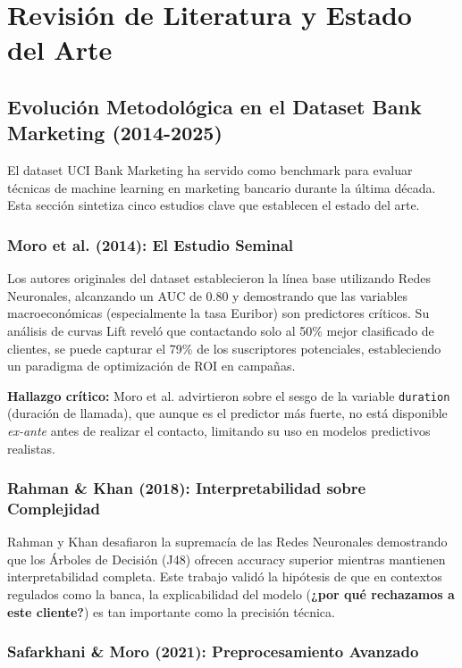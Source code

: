 \documentclass[12pt,letterpaper]{article}
\begin{document}
\newpage
\section{Revisión de Literatura y Estado del Arte}

\subsection{Evolución Metodológica en el Dataset Bank Marketing (2014-2025)}

El dataset UCI Bank Marketing ha servido como benchmark para evaluar técnicas de machine learning en marketing bancario durante la última década. Esta sección sintetiza cinco estudios clave que establecen el estado del arte.

\subsubsection{Moro et al. (2014): El Estudio Seminal}

Los autores originales del dataset \cite{moro2014} establecieron la línea base utilizando Redes Neuronales, alcanzando un AUC de 0.80 y demostrando que las variables macroeconómicas (especialmente la tasa Euribor) son predictores críticos. Su análisis de curvas Lift reveló que contactando solo al 50\% mejor clasificado de clientes, se puede capturar el 79\% de los suscriptores potenciales, estableciendo un paradigma de optimización de ROI en campañas.

\textbf{Hallazgo crítico:} Moro et al. advirtieron sobre el sesgo de la variable \texttt{duration} (duración de llamada), que aunque es el predictor más fuerte, no está disponible \textit{ex-ante} antes de realizar el contacto, limitando su uso en modelos predictivos realistas.

\subsubsection{Rahman \& Khan (2018): Interpretabilidad sobre Complejidad}

Rahman y Khan \cite{rahman2018} desafiaron la supremacía de las Redes Neuronales demostrando que los Árboles de Decisión (J48) ofrecen accuracy superior mientras mantienen interpretabilidad completa. Este trabajo validó la hipótesis de que en contextos regulados como la banca, la explicabilidad del modelo (\textbf{¿por qué rechazamos a este cliente?}) es tan importante como la precisión técnica.

\subsubsection{Safarkhani \& Moro (2021): Preprocesamiento Avanzado}
\end{document}
